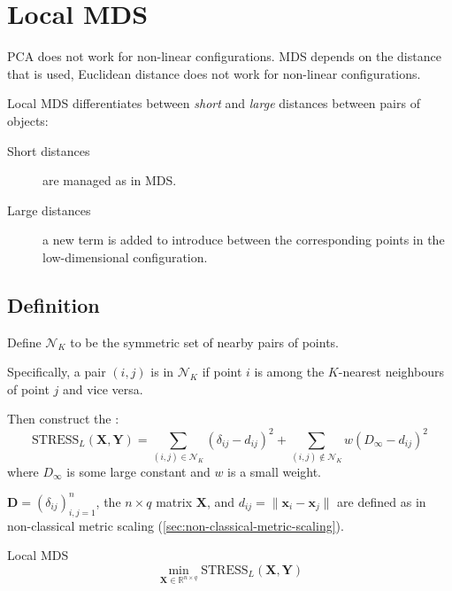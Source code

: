 \section{Local MDS}

PCA does not work for non-linear configurations. MDS depends on the distance that is
used, Euclidean distance does not work for non-linear configurations.

\begin{note}
	Local MDS differentiates between \emph{short} and \emph{large} distances between
	pairs of objects:
	\begin{description}
		\item[Short distances] are managed as in MDS.
		\item[Large distances] a new term is added to introduce  between the
			corresponding points in the low-dimensional configuration.
	\end{description}
\end{note}

\subsection{Definition}

Define $\mathcal N_K$ to be the symmetric set of nearby pairs of points.

Specifically, a pair $(i, j)$ is in $\mathcal N_K$ if point $i$ is among the $K$-nearest
neighbours of point $j$ and vice versa.

Then construct the :
\begin{equation*}
	\text{STRESS}_L(\boldsymbol X, \boldsymbol Y) = \sum_{(i, j) \in \mathcal N_K} (\delta_{ij} - d_{ij})^2
	+ \sum_{(i, j) \notin \mathcal N_K} w(D_\infty - d_{ij})^2
\end{equation*}
where $D_\infty$ is some large constant and $w$ is a small weight.

$\boldsymbol D = (\delta_{ij})^n_{i,j=1}$, the $n \times q$ matrix $\boldsymbol X$, and
$d_{ij} = \lVert \boldsymbol x_i - \boldsymbol x_j \rVert$ are defined as in non-classical
metric scaling (\cref{sec:non-classical-metric-scaling}).

\begin{problem}{Local MDS}{}
\begin{equation*}
	\min_{\boldsymbol X \in \mathds{R}^{n \times q}} \text{STRESS}_L(\boldsymbol X, \boldsymbol Y)
\end{equation*}
\end{problem}

